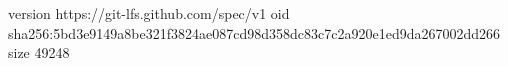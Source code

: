 version https://git-lfs.github.com/spec/v1
oid sha256:5bd3e9149a8be321f3824ae087cd98d358dc83c7c2a920e1ed9da267002dd266
size 49248
